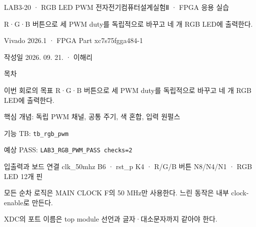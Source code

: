 

\renewcommand{\small}{\fontsize{8.7}{10.5}\selectfont}
\setlength{\leftmargini}{1.35em}

\begin{frame}{LAB3-20 · RGB LED PWM}
\small
전자전기컴퓨터설계실험Ⅱ · FPGA 응용 실습\par\vspace{0.28cm}
R·G·B 버튼으로 세 PWM duty를 독립적으로 바꾸고 네 개 RGB LED에 출력한다.\par\vspace{0.28cm}
Vivado 2026.1 · FPGA Part xc7s75fgga484-1\par\vspace{0.28cm}
작성일 2026. 09. 21. · 이해리
\end{frame}

\begin{frame}[label=lab3-contents]{목차}
\small
{}\par\vspace{0.28cm}
\par\vspace{0.28cm}
\par\vspace{0.28cm}
\par\vspace{0.28cm}
\par\vspace{0.28cm}
\end{frame}

\begin{frame}[label=goal]{이번 회로의 목표}
\small
R·G·B 버튼으로 세 PWM duty를 독립적으로 바꾸고 네 개 RGB LED에 출력한다.\par\vspace{0.28cm}
핵심 개념: 독립 PWM 채널, 공통 주기, 색 혼합, 입력 원펄스\par\vspace{0.28cm}
기능 TB: \texttt{tb\_rgb\_pwm}\par\vspace{0.18cm}
예상 PASS: \texttt{LAB3\_RGB\_PWM\_PASS checks=2}
\end{frame}

\begin{frame}{입출력과 보드 연결}
\small
clk\_50mhz B6 · rst\_p K4 · R/G/B 버튼 N8/N4/N1 · RGB LED 12개 핀\par\vspace{0.32cm}
모든 순차 로직은 MAIN CLOCK F의 50 MHz만 사용한다. 느린 동작은 내부 clock-enable로 만든다.\par\vspace{0.28cm}
XDC의 포트 이름은 top module 선언과 글자·대소문자까지 같아야 한다.
\end{frame}

